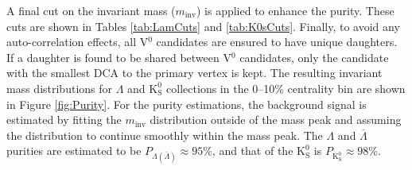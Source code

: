 \documentclass[ALICE,manyauthors]{cernphprep}
\newcommand{\minv}{$m_{\mathrm{inv}}$\xspace}
\newcommand{\Lam}{$\Lambda$\xspace}
\newcommand{\ALam}{$\overline{\Lambda}$\xspace}
\newcommand{\Ks}{$\mathrm{K^{0}_{S}}$\xspace}
\newcommand{\Vz}{V$^{0}$\xspace}
\begin{document}
A final cut on the invariant mass (\minv) is applied to enhance the purity.
These cuts are shown in Tables \ref{tab:LamCuts} and \ref{tab:K0sCuts}.
Finally, to avoid any auto-correlation effects, all \Vz candidates are ensured to have unique daughters. 
If a daughter is found to be shared between \Vz candidates, only the candidate with the smallest DCA to the primary vertex is kept.
The resulting invariant mass distributions for \Lam and \Ks collections in the 0--10\% centrality bin are shown in Figure \ref{fig:Purity}.
For the purity estimations, the background signal is estimated by fitting the \minv distribution outside of the mass peak and assuming the distribution to continue smoothly within the mass peak.
The \Lam and \ALam purities are estimated to be $P_{\Lambda(\overline{\Lambda})} \approx 95\%$, and that of the \Ks is $P_{\mathrm{K^{0}_{S}}} \approx 98\%$.
\end{document}
